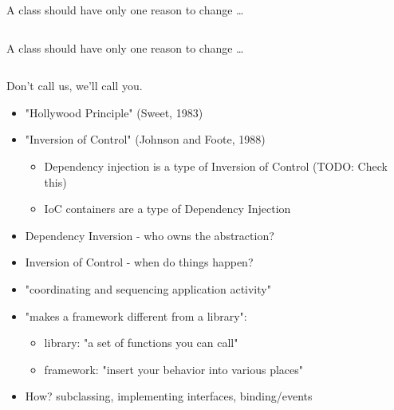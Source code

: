 \documentclass{beamer}
\begin{document}
\begin{frame}{A class should have only one reason to change \ldots}
    \vspace{0cm}
    \begin{columns}
        \column{\dimexpr\paperwidth-40pt}
        
    \end{columns}
\end{frame}

\begin{frame}{A class should have only one reason to change \ldots}
    \vspace{0cm}
    \begin{columns}
        \column{\dimexpr\paperwidth-40pt}
        
    \end{columns}
\end{frame}

\begin{frame}{Don't call us, we'll call you.}
    \begin{itemize}
        \item "Hollywood Principle" (Sweet, 1983)
        \item "Inversion of Control" (Johnson and Foote, 1988)
            \begin{itemize}
                \item Dependency injection is a type of Inversion of Control (TODO: Check this)
                \item IoC containers are a type of Dependency Injection
            \end{itemize}
        \item Dependency Inversion - who owns the abstraction?
        \item Inversion of Control - when do things happen?
        \item "coordinating and sequencing application activity"         
        \item "makes a framework different from a library":
            \begin{itemize}
                \item library: "a set of functions you can call"
                \item framework: "insert your behavior into various places"
            \end{itemize}
        \item How? subclassing, implementing interfaces, binding/events
    \end{itemize}
\end{frame}
\end{document}
